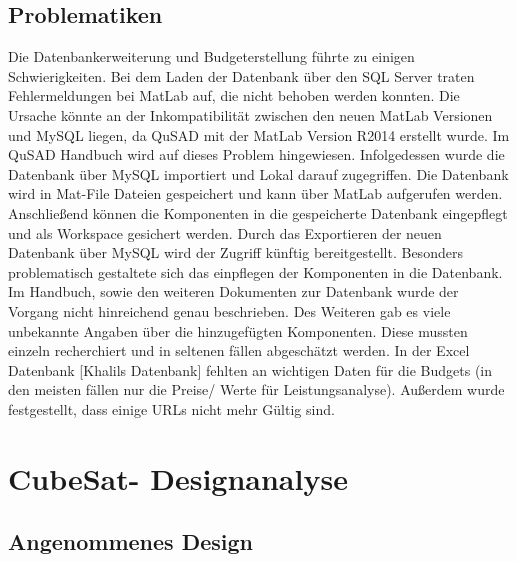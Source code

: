 			\subsection{Problematiken}
			Die Datenbankerweiterung und Budgeterstellung führte zu einigen Schwierigkeiten. Bei dem Laden der Datenbank über den SQL Server traten Fehlermeldungen bei MatLab auf, die nicht behoben werden konnten. Die Ursache könnte an der Inkompatibilität zwischen den neuen MatLab Versionen und MySQL liegen, da QuSAD mit der MatLab Version R2014 erstellt wurde. Im QuSAD Handbuch wird auf dieses Problem hingewiesen. Infolgedessen wurde die Datenbank über MySQL importiert und Lokal darauf zugegriffen. Die Datenbank wird in Mat-File Dateien gespeichert und kann über MatLab aufgerufen werden. Anschließend können die Komponenten in die gespeicherte Datenbank eingepflegt und als Workspace gesichert werden. Durch das Exportieren der neuen Datenbank über MySQL wird der Zugriff künftig bereitgestellt. Besonders problematisch gestaltete sich das einpflegen der Komponenten in die Datenbank. Im Handbuch, sowie den weiteren Dokumenten zur Datenbank wurde der Vorgang nicht hinreichend genau beschrieben. Des Weiteren gab es viele unbekannte Angaben über die hinzugefügten Komponenten. Diese mussten einzeln recherchiert und in seltenen fällen abgeschätzt werden. In der Excel Datenbank [Khalils Datenbank] fehlten an wichtigen Daten für die Budgets (in den meisten fällen nur die Preise/ Werte für Leistungsanalyse). Außerdem wurde festgestellt, dass einige URLs nicht mehr Gültig sind.
		\section{CubeSat- Designanalyse}
				\subsection{Angenommenes Design}
